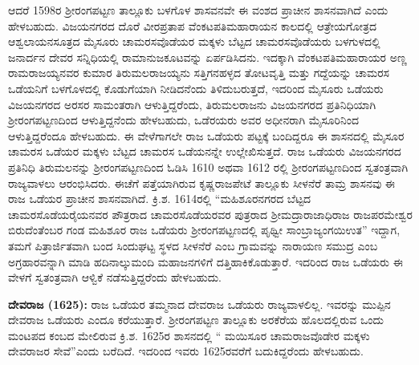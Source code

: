 \newpage

ಆದರೆ 1598ರ ಶ‍್ರೀರಂಗಪಟ್ಟಣ ತಾಲ್ಲೂಕು ಬಳಗೊಳ ಶಾಸವನವೇ ಈ ವಂಶದ ಪ್ರಾಚೀನ ಶಾಸನವಾಗಿದೆ ಎಂದು ಹೇಳಬಹುದು. ವಿಜಯನಗರದ ದೊರೆ ವೀರಪ್ರತಾಪ ವೆಂಕಟಪತಿಮಹಾರಾಯನ ಕಾಲದಲ್ಲಿ ಆತ್ರೇಯಗೋತ್ರದ ಆಶ್ವಲಾಯನ\-ಸೂತ್ರದ ಮೈಸೂರು ಚಾಮರಸವೊಡೆಯರ ಮಕ್ಕಳು ಬೆಟ್ಟದ ಚಾಮರಸವೊಡೆಯರು ಬಳಗುಳದಲ್ಲಿ ಜನಾರ್ದನ ದೇವರ ಸನ್ನಿಧಿಯಲ್ಲಿ ರಾಮಾನುಜಕೂಟವನ್ನು ಏರ್ಪಡಿಸಿದನು. ಇದಕ್ಕಾಗಿ ವೆಂಕಟಪತಿಮಹಾರಾಯರ ಅಣ್ಣ ರಾಮರಾಜಯ್ಯನವರ ಕುಮಾರ ತಿರುಮಲರಾಜಯ್ಯನು ಸತ್ತಿಗನಹಳ್ಳದ ತೋಟವೃತ್ತಿ ಮತ್ತು ಗದ್ದೆಯನ್ನು ಚಾಮರಸ ಒಡೆಯನಿಗೆ ಬಳಗೊಳದಲ್ಲಿ ಕೊಡುಗೆಯಾಗಿ ನೀಡಿದನೆಂದು ತಿಳಿದುಬರುತ್ತದೆ, ಇದರಿಂದ ಮೈಸೂರು ಒಡೆಯರು ವಿಜಯನಗರದ ಅರಸರ ಸಾಮಂತರಾಗಿ ಆಳುತ್ತಿದ್ದರೆಂದು, ತಿರುಮಲರಾಜನು ವಿಜಯನಗರದ ಪ್ರತಿನಿಧಿಯಾಗಿ ಶ‍್ರೀರಂಗಪಟ್ಟಣದಿಂದ ಆಳುತ್ತಿದ್ದನೆಂದು ಹೇಳಬಹುದು, ಒಡೆರಯರು ಅವರ ಅಧೀನರಾಗಿ ಮೈಸೂರಿನಿಂದ ಆಳುತ್ತಿದ್ದರೆಂದೂ ಹೇಳಬಹುದು. ಈ ವೇಳೆಗಾಗಲೇ ರಾಜ ಒಡೆಯರು ಪಟ್ಟಕ್ಕೆ ಬಂದಿದ್ದರೂ ಈ ಶಾಸನದಲ್ಲಿ ಮೈಸೂರ ಚಾಮರಸ ಒಡೆಯರ ಮಕ್ಕಳು ಬೆಟ್ಟದ ಚಾಮರಸ ಒಡೆಯನನ್ನೇ ಉಲ್ಲೇಖಿಸುತ್ತದೆ. ರಾಜ ಒಡೆಯರು ವಿಜಯನಗರದ ಪ್ರತಿನಿಧಿ ತಿರುಮಲನನ್ನು ಶ‍್ರೀರಂಗಪಟ್ಟಣದಿಂದ ಓಡಿಸಿ 1610 ಅಥವಾ 1612 ರಲ್ಲಿ ಶ‍್ರೀರಂಗಪಟ್ಟಣದಿಂದ ಸ್ವತಂತ್ರವಾಗಿ ರಾಜ್ಯವಾಳಲು ಆರಂಭಿಸಿದರು. ಈಚೆಗೆ ಪತ್ತೆಯಾಗಿರುವ ಕೃಷ್ಣರಾಜಪೇಟೆ ತಾಲ್ಲೂಕು ಸೀಳನೆರೆ ತಾಮ್ರ ಶಾಸನವು ಈ ರಾಜ ಒಡೆಯರ ಪ್ರಾಚೀನ ಶಾಸನವಾಗಿದೆ. ಕ್ರಿ.ಶ. 1614ರಲ್ಲಿ “ಮಹಿಶೂರನಗರದ ಬೆಟ್ಟದ ಚಾಮರಸೊಡೆಯರೈಯನವರ ಪೌತ್ರರಾದ ಚಾಮರಸೊಡೆಯರವರ ಪುತ್ರರಾದ ಶ‍್ರೀಮದ್ರಾರಾಜಾಧಿರಾಜ ರಾಜಪರಮೇಶ್ವರ ಬಿರುದೆಂತೆಂಬರ ಗಂಡ ಮಹಿಶೂರ ರಾಜ ಒಡೆಯರು ಶ‍್ರೀರಂಗಪಟ್ಟಣದಲ್ಲಿ ಪೃಥ್ವೀ ಸಾಂಬ್ರಾಜ್ಯಂಗಯಿಉತ” ಇದ್ದಾಗ, ತಮಗೆ ಪಿತ್ರಾರ್ಜಿತವಾಗಿ ಬಂದ ಸಿಂದುಘಟ್ಟ ಸ್ಥಳದ ಸೀಳನೆರೆ ಎಂಬ ಗ್ರಾಮವನ್ನು ನಾರಾಯಣ ಸಮುದ್ರ ಎಂಬ ಅಗ್ರಹಾರವನ್ನಾಗಿ ಮಾಡಿ ಹದಿನಾಲ್ಕುಮಂದಿ ಮಹಾಜನಗಳಿಗೆ ದತ್ತಿಹಾಕಿಕೊಡುತ್ತಾರೆ. ಇದರಿಂದ ರಾಜ ಒಡೆಯರು ಈ ವೇಳಗೆ ಸ್ವತಂತ್ರವಾಗಿ ಆಳ್ವಿಕೆ ನಡೆಸುತ್ತಿದ್ದರೆಂದು ಹೇಳಬಹುದು. 

\textbf{ ದೇವರಾಜ (1625): } ರಾಜ ಒಡೆಯರ ತಮ್ಮನಾದ ದೇವರಾಜ ಒಡೆಯರು ರಾಜ್ಯವಾಳಲಿಲ್ಲ. ಇವರನ್ನು ಮುಪ್ಪಿನ ದೇವರಾಜ ಒಡೆಯರು ಎಂದೂ ಕರೆಯುತ್ತಾರೆ. ಶ‍್ರೀರಂಗಪಟ್ಟಣ ತಾಲ್ಲೂಕು ಅರಕೆರೆಯ ಹೊಲದಲ್ಲಿರುವ ಒಂದು ಮಂಟಪದ ಕಂಬದ ಮೇಲಿರುವ ಕ್ರಿ.ಶ. 1625ರ ಶಾಸನದಲ್ಲಿ “ ಮಯಿಸೂರ ಚಾಮರಾಜವೊಡೇರ ಮಕ್ಕಳು ದೇವರಾಜರ ಸೇವೆ”ಎಂದು ಬರೆದಿದೆ. ಇದರಿಂದ ಇವರು 1625ರವರೆಗೆ ಬದುಕಿದ್ದರೆಂದು ಹೇಳಬಹುದು.

